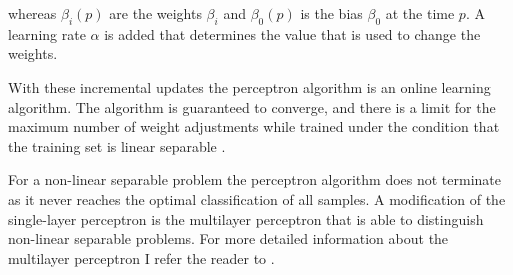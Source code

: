 whereas $\beta_i(p)$ are the weights $\beta_i$ and $\beta_0(p)$ is the bias $\beta_0$ at the time $p$.
A learning rate $\alpha$ is added that determines the value that is used to change the weights.

With these incremental updates the perceptron algorithm is an online learning algorithm.
The algorithm is guaranteed to converge, and there is a limit for the maximum number of weight adjustments while trained under the condition that the training set is linear separable \cite{Rosenblatt1957TheAutomaton}. %

For a non-linear separable problem the perceptron algorithm does not terminate as it never reaches the optimal classification of all samples. %
A modification of the single-layer perceptron is the multilayer perceptron that is able to distinguish non-linear separable problems.
For more detailed information about the multilayer perceptron I refer the reader to \cite{Rosenblatt1961Principlesmechanisms}.











